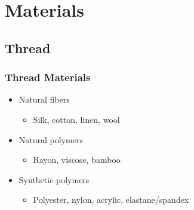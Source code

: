 \documentclass{beamer}
\begin{document}
\section{Materials}

\begin{frame}[fragile]
\tableofcontents[currentsection]
\end{frame}

\subsection{Thread}

\begin{frame}[fragile]
\tableofcontents[currentsubsection]
\end{frame}


\begin{frame}[fragile]
\frametitle{Thread Materials}
\begin{itemize}
\item Natural fibers
    \begin{itemize}
        \item Silk, cotton, linen, wool
    \end{itemize}
\item Natural polymers
    \begin{itemize}
        \item Rayon, viscose, bamboo
    \end{itemize}
\item Synthetic polymers
    \begin{itemize}
        \item Polyester, nylon, acrylic, elastane/spandex
    \end{itemize}
\end{itemize}
\end{frame}
\end{document}
